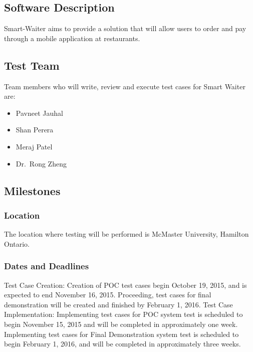 \documentclass[12pt]{article}
\begin{document}
\subsection{Software Description}
Smart-Waiter aims to provide a solution that will allow users to order and pay through a mobile application at restaurants. 

\subsection{Test Team} 
Team members who will write, review and execute test cases for Smart Waiter are: 

\begin{itemize}
 \item Pavneet Jauhal
 \item Shan Perera
 \item Meraj Patel
 \item Dr.\ Rong Zheng
\end{itemize}  

\subsection{Milestones}

\subsubsection{Location}
The location where testing will be performed is McMaster University, Hamilton Ontario.


\subsubsection{Dates and Deadlines}

Test Case Creation:
Creation of POC test cases begin October 19, 2015, and is expected to end November 16, 2015. Proceeding, test cases for final demonstration will be created and finished by February 1, 2016.
\newline
\newline
Test Case Implementation:
Implementing test cases for POC system test is scheduled to begin November 15, 2015 and will be completed in approximately one week.
\newline
\newline
Implementing test cases for Final Demonstration system test is scheduled to begin February 1, 2016, and will be completed in approximately three weeks. 
\end{document}
